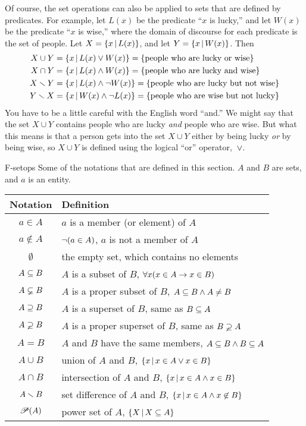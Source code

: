 Of course, the set operations can also be applied to sets
that are defined by predicates.   For example, let 
$L(x)$ be the predicate ``$x$ is lucky,'' and let $W(x)$ be
the predicate ``$x$ is wise,'' where the domain of discourse for
each predicate is the set of people.  Let $X = \{x\,|\, L(x)\}$,
and let $Y=\{x\,|\, W(x)\}$.  Then
\begin{align*}
  X\cup Y &= \{x\,|\, L(x)\vee W(x)\} = \{\text{people who are lucky or wise}\}\\
  X\cap Y &= \{x\,|\, L(x)\wedge W(x)\} = \{\text{people who are lucky and wise}\}\\
  X\smallsetminus Y &= \{x\,|\, L(x)\wedge \lnot W(x)\} = \{\text{people who are lucky but not wise}\}\\
  Y\smallsetminus X &= \{x\,|\, W(x)\wedge \lnot L(x)\} = \{\text{people who are wise but not lucky}\}
\end{align*}
You have to be a little careful with the English word ``and.''  We might say that
the set $X\cup Y$ contains people who are lucky \emph{and} people who are
wise.   But what this means is that a person gets into the set
$X\cup Y$ either by being lucky \emph{or} by being wise, so
$X\cup Y$ is defined using the logical ``or'' operator,~$\vee$.

\medbreak

\fig
  {F-setops}
  {Some of the notations that are defined in this section.  $A$ and $B$ are
   sets, and $a$ is an entity.}
  {\begin{tabular}{|c|l|}
        \hline
        \strut\textbf{Notation} & \textbf{Definition}\\
        \hline
        \strut $a\in A$      & $a$ is a member (or element) of $A$\\ 
        \strut $a\not\in A$  & $\lnot(a\in A)$, $a$ is not a member of $A$\\
        \strut $\emptyset$   & the empty set, which contains no elements\\
        \strut $A\subseteq B$     & $A$ is a subset of $B$, $\forall x(x\in A\rightarrow x\in B)$\\
        \strut $A\varsubsetneq B$    & $A$ is a proper subset of $B$, $A\subseteq B \wedge A\not=B$\\
        \strut $A\supseteq B$     & $A$ is a superset of $B$, same as $B\subseteq A$\\
        \strut $A\varsupsetneq B$    & $A$ is a proper superset of $B$, same as $B\varsupsetneq A$\\
        \strut $A=B$         & $A$ and $B$ have the same members, $A\subseteq B\wedge B\subseteq A$\\
        \strut $A\cup B$     & union of $A$ and $B$, $\{x\,|\, x\in A\vee x\in B\}$\\
        \strut $A\cap B$     & intersection of $A$ and $B$, $\{x\,|\, x\in A\wedge x\in B\}$\\
        \strut $A\smallsetminus B$ & set difference of $A$ and $B$, $\{x\,|\, x\in A\wedge x\not\in B\}$\\
        \strut ${\mathscr P}(A)$     & power set of $A$, $\{X\,|\, X\subseteq A\}$\\
        \hline
     \end{tabular}
   }

